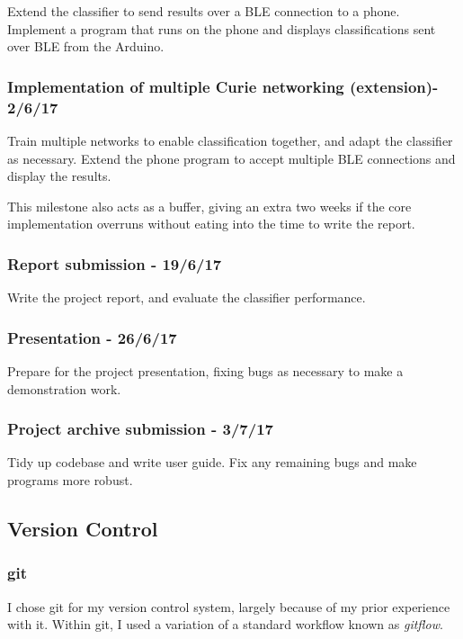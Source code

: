 \documentclass[a4paper]{article}
\begin{document}
Extend the classifier to send results over a BLE connection to a phone. Implement a program that runs on the phone and displays classifications sent over BLE from the Arduino.

\subsubsection{Implementation of multiple Curie networking (extension)- 2/6/17}

Train multiple networks to enable classification together, and adapt the classifier as necessary.
Extend the phone program to accept multiple BLE connections and display the results.

This milestone also acts as a buffer, giving an extra two weeks if the core implementation overruns without eating into the time to write the report.

\subsubsection{Report submission - 19/6/17}

Write the project report, and evaluate the classifier performance. 

\subsubsection{Presentation - 26/6/17}

Prepare for the project presentation, fixing bugs as necessary to make a demonstration work. 

\subsubsection{Project archive submission - 3/7/17}

Tidy up codebase and write user guide. Fix any remaining bugs and make programs more robust.

\subsection{Version Control}%

\subsubsection{git}

I chose git\cite{ppref0} for my version control system, largely because of my prior experience with it. Within git, I used a variation of a standard workflow known as \textit{gitflow}.\cite{ppref1} 
\end{document}
